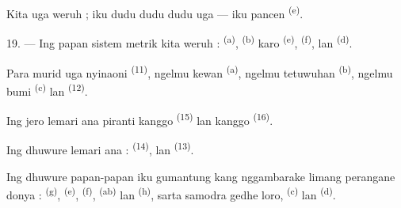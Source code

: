 Kita uga weruh  ; iku dudu  dudu
 dudu uga  — iku pancen
 \textsuperscript{(e)}.

19. --- Ing papan sistem metrik kita weruh : 
\textsuperscript{(a)},  \textsuperscript{(b)} karo
  \textsuperscript{(e)},
 \textsuperscript{(f)},  lan
 \textsuperscript{(d)}.

Para murid uga nyinaoni  \textsuperscript{(11)},
ngelmu kewan \textsuperscript{(a)}, ngelmu tetuwuhan
\textsuperscript{(b)}, ngelmu bumi \textsuperscript{(c)} lan
 \textsuperscript{(12)}.

Ing jero lemari ana piranti kanggo 
\textsuperscript{(15)} lan kanggo  \textsuperscript{(16)}.

Ing dhuwure lemari ana :  \textsuperscript{(14)},
 lan  \textsuperscript{(13)}.

Ing dhuwure papan-papan iku gumantung  kang nggambarake
limang perangane donya :  \textsuperscript{(g)},
 \textsuperscript{(e)}, 
\textsuperscript{(f)},  \textsuperscript{(ab)} lan
 \textsuperscript{(h)}, sarta samodra gedhe loro,
 \textsuperscript{(c)} lan 
\textsuperscript{(d)}.

\VUsaut{6.0mm}
\VUfilet{22mm}
